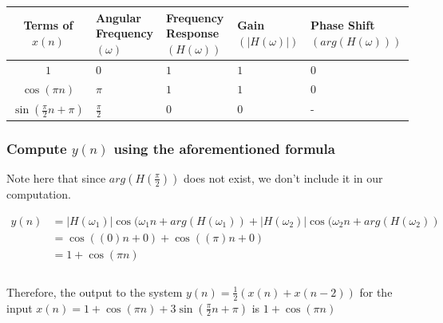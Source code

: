 \documentclass{article}
\newenvironment{directsubsubs}{
  \makeatletter
  \renewcommand\thesubsubsection{\thesection.\Roman{subsubsection}}
  \makeatother
}{
  \makeatletter
  \renewcommand\thesubsubsection{\thesubsection.\Roman{subsubsection}}
  \makeatother
}
\renewcommand{\thesubsection}{\thesection.\alph{subsection}}
\renewcommand{\thesubsubsection}{\thesection.\alph{subsection}.\Roman{subsubsection}}
\begin{document}
\begin{directsubsubs}
\begin{tabularx}{\linewidth}{| c || Y | Y | Y | Y |}
	\hline
	Terms of $x(n)$ & Angular Frequency $(\omega)$ & Frequency Response $(H(\omega))$ & Gain $(|H(\omega)|)$ & Phase Shift $(arg(H(\omega)))$ \\
	\hline
	$1$ & $0$ & $1$ & $1$ & $0$ \\
	$\cos{({\pi}n)}$ & $\pi$ & $1$ & $1$ & $0$ \\
	$\sin{(\tfrac{\pi}{2}n + \pi)}$ & $\tfrac{\pi}{2}$ & $0$ & $0$ & - \\
	\hline
\end{tabularx}

\subsubsection[~\thesubsubsection]{Compute $y(n)$ using the aforementioned formula}

Note here that since $arg(H(\frac{\pi}{2}))$ does not exist, we don't include it in our computation.

\begin{align*}
	y(n) &= |H(\omega_1)|\cos{({\omega_1}n + arg(H(\omega_1))} + |H(\omega_2)|\cos{({\omega_2}n + arg(H(\omega_2))} \\
	&= \cos{((0)n + 0)} + \cos{((\pi)n + 0)} \\
	&= 1 + \cos{({\pi}n)} \\\\
\end{align*}

Therefore, the output to the system $y(n) = \frac{1}{2}(x(n) + x(n - 2))$ for the input $x(n) = 1 + \cos{({\pi}n)} + 3\sin{(\frac{\pi}{2}n + \pi)}$ is $1 + \cos{({\pi}n)}$

\end{directsubsubs}
\end{document}
